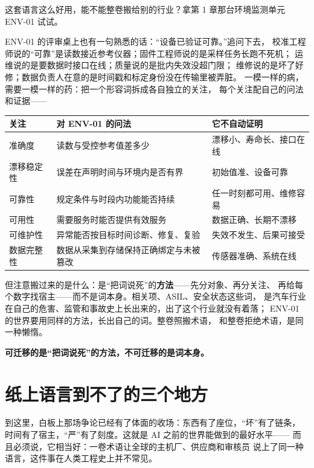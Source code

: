 这套语言这么好用，能不能整卷搬给别的行业？拿第 1 章那台环境监测单元 ENV-01 试试。

ENV-01 的评审桌上也有一句熟悉的话：“设备已验证可靠。”追问下去，
校准工程师说的“可靠”是读数接近参考仪器；固件工程师说的是采样任务长跑不死机；
运维说的是要数据时接口在线；质量说的是批内失效没超门限；
维修说的是坏了好修；数据负责人在意的是时间戳和标定身份没在传输里被弄脏。
一模一样的病，需要一模一样的药：把一个形容词拆成各自独立的关注，
每个关注配自己的问法和证据——

\begin{center}
\begingroup\small
\setlength{\tabcolsep}{4pt}
\begin{tabularx}{\linewidth}{@{}XXX@{}}
\toprule
关注 & 对 ENV-01 的问法 & 它不自动证明 \\
\midrule
准确度 & 读数与受控参考值差多少 & 漂移小、寿命长、接口在线 \\
漂移稳定性 & 误差在声明时间与环境内是否有界 & 初始值准、设备可靠 \\
可靠性 & 规定条件与时段内功能能否持续 & 任一时刻都可用、维修容易 \\
可用性 & 需要服务时能否提供有效服务 & 数据正确、长期不漂移 \\
可维护性 & 异常能否按目标时间诊断、修复、复验 & 失效不发生、后果可接受 \\
数据完整性 & 数据从采集到存储保持正确绑定与未被篡改 & 传感器准确、系统在线 \\
\bottomrule
\end{tabularx}
\endgroup
\end{center}

但注意搬过来的是什么：是“把词说死”的\textbf{方法}——先分对象、再分关注、
再给每个数字找宿主——而不是词本身。相关项、ASIL、安全状态这些词，
是汽车行业在自己的危害、监管和事故史上长出来的，出了这个行业就没有着落；
ENV-01 的世界要用同样的方法，长出自己的词。整卷照搬术语，
和整卷拒绝术语，是同一种懒惰。

\textbf{可迁移的是“把词说死”的方法，不可迁移的是词本身。}

\section{纸上语言到不了的三个地方}

到这里，白板上那场争论已经有了体面的收场：东西有了座位，“坏”有了链条，
时间有了宿主，“严”有了刻度。这就是 AI 之前的世界能做到的最好水平——
而且必须说，它相当好：一卷术语让全球的主机厂、供应商和审核员
说上了同一种语言，这件事在人类工程史上并不常见。

